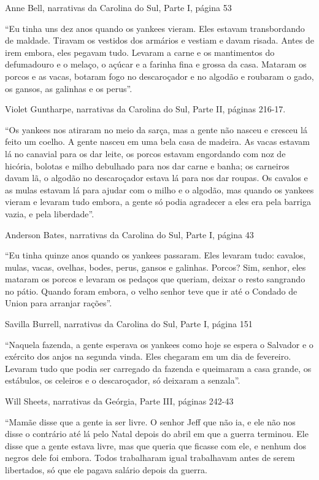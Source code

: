 Anne Bell, narrativas da Carolina do Sul, Parte I, página 53

``Eu tinha uns dez anos quando os yankees vieram. Eles estavam
transbordando de maldade. Tiravam os vestidos dos armários e vestiam e
davam risada. Antes de irem embora, eles pegavam tudo. Levaram a carne e
os mantimentos do defumadouro e o melaço, o açúcar e a farinha fina e
grossa da casa. Mataram os porcos e as vacas, botaram fogo no
descaroçador e no algodão e roubaram o gado, os gansos, as galinhas e os
perus''.

Violet Guntharpe, narrativas da Carolina do Sul, Parte II, páginas
216-17.

``Os yankees nos atiraram no meio da sarça, mas a gente não nasceu e
cresceu lá feito um coelho. A gente nasceu em uma bela casa de madeira.
As vacas estavam lá no canavial para os dar leite, os porcos estavam
engordando com noz de hicória, bolotas e milho debulhado para nos dar
carne e banha; os carneiros davam lã, o algodão no descaroçador estava
lá para nos dar roupas. Os cavalos e as mulas estavam lá para ajudar com
o milho e o algodão, mas quando os yankees vieram e levaram tudo embora,
a gente só podia agradecer a eles era pela barriga vazia, e pela
liberdade''.

Anderson Bates, narrativas da Carolina do Sul, Parte I, página 43

``Eu tinha quinze anos quando os yankees passaram. Eles levaram tudo:
cavalos, mulas, vacas, ovelhas, bodes, perus, gansos e galinhas. Porcos?
Sim, senhor, eles mataram os porcos e levaram os pedaços que queriam,
deixar o resto sangrando no pátio. Quando foram embora, o velho senhor
teve que ir até o Condado de Union para arranjar rações''.

Savilla Burrell, narrativas da Carolina do Sul, Parte I, página 151

``Naquela fazenda, a gente esperava os yankees como hoje se espera o
Salvador e o exército dos anjos na segunda vinda. Eles chegaram em um
dia de fevereiro. Levaram tudo que podia ser carregado da fazenda e
queimaram a casa grande, os estábulos, os celeiros e o descaroçador, só
deixaram a senzala''.

Will Sheets, narrativas da Geórgia, Parte III, páginas 242-43

``Mamãe disse que a gente ia ser livre. O senhor Jeff que não ia, e ele
não nos disse o contrário até lá pelo Natal depois do abril em que a
guerra terminou. Ele disse que a gente estava livre, mas que queria que
ficasse com ele, e nenhum dos negros dele foi embora. Todos trabalharam
igual trabalhavam antes de serem libertados, só que ele pagava salário
depois da guerra.

